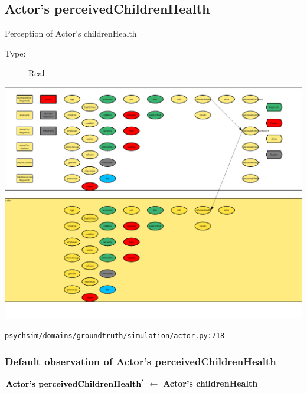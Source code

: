 \documentclass{article}%
\begin{document}
\subsection{Actor's perceivedChildrenHealth}%
\label{subsec:Actor's perceivedChildrenHealth}%
Perception of Actor's childrenHealth%
\begin{description}%
\item[Type:]%
Real%
\end{description}%
\includegraphics[width=\textwidth]{images/perceivedChildrenHealthOfActor.png}%
\begin{flushleft}%
\verb|psychsim/domains/groundtruth/simulation/actor.py:718|%
\end{flushleft}%
\subsubsection{Default observation of Actor's perceivedChildrenHealth}%
\label{ssubsec:Default observation of Actor's perceivedChildrenHealth}%
\begin{flushleft}%
$\mbox{\textbf{Actor's perceivedChildrenHealth}} '$%
$\leftarrow$%
\textbf{Actor's childrenHealth}%
\end{flushleft}

%
\end{document}
